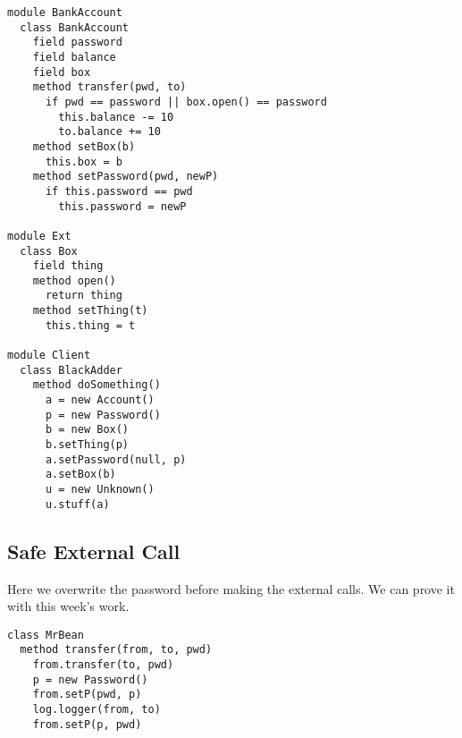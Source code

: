 \begin{lstlisting}[language=chainmail, mathescape=true, frame=lines]
module BankAccount
  class BankAccount
    field password
    field balance
    field box
    method transfer(pwd, to)
      if pwd == password || box.open() == password
        this.balance -= 10
        to.balance += 10
    method setBox(b)
      this.box = b
    method setPassword(pwd, newP)
      if this.password == pwd
        this.password = newP
      
module Ext
  class Box
    field thing
    method open()
      return thing
    method setThing(t)
      this.thing = t
    
module Client
  class BlackAdder
    method doSomething()
      a = new Account()
      p = new Password()
      b = new Box()
      b.setThing(p)
      a.setPassword(null, p)
      a.setBox(b)
      u = new Unknown()
      u.stuff(a)
\end{lstlisting}

\subsection{Safe External Call}

Here we overwrite the password before making the external calls. 
We can prove it with this week's work.

\begin{lstlisting}[language=chainmail, mathescape=true, frame=lines]
class MrBean
  method transfer(from, to, pwd)
    from.transfer(to, pwd)
    p = new Password()
    from.setP(pwd, p)
    log.logger(from, to)
    from.setP(p, pwd)
\end{lstlisting}
